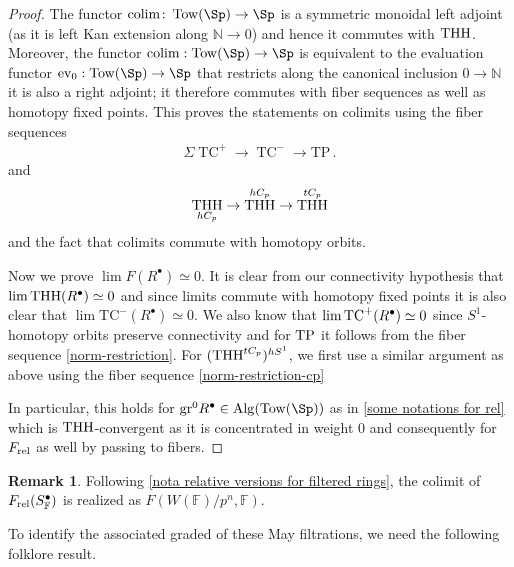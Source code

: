 \documentclass[english,10pt]{amsart}
\newcommand{\rel}{\textup{rel}}
\newcommand{\field}{\mathbb{F}}
\theoremstyle{definition}
\newtheorem{rema}{Remark}[section]
\numberwithin{equation}{section}
\DeclareMathOperator{\TC}{TC}
\newcommand{\ntc}{\mathrm{TC}^{-}}
\DeclareMathOperator{\tp}{\ensuremath{\textup{TP}}}
\DeclareMathOperator{\tc}{\ensuremath{\textup{TC}}}
\DeclareMathOperator{\thh}{\ensuremath{\textup{THH}}}
\DeclareMathOperator*{\colim}{colim}
\newcommand{\Tow}{\mathrm{Tow}}
\newcommand{\Alg}{\mathrm{Alg}}
\newcommand{\TP}{\mathrm{TP}}
\newcommand{\N}{\mathbb{N}}
\def\co{\colon\thinspace}
\begin{document}
\begin{proof}
The functor $\colim \co \Tow(\Sp)\to \Sp$ is a symmetric monoidal left adjoint (as it is left Kan extension along $\N\to 0$) \cite[Corollary~3.7]{nikolaus2016stablemultyoneda} and hence it commutes with $\thh$. Moreover, the functor $\mathrm{colim}: \mathrm{Tow}(\Sp)\to \Sp$ is equivalent to the evaluation functor $\mathrm{ev}_0: \mathrm{Tow}(\Sp)\to \Sp$ that restricts along the canonical inclusion $0\to \N$ it is also a right adjoint; it therefore commutes with fiber sequences as well as homotopy fixed points. 
This proves the statements on colimits using the fiber sequences 
\begin{align}\label{norm-restriction}
    \Sigma \TC^+\to \TC^{-}\to \TP \,.
\end{align}
and 
\begin{align}\label{norm-restriction-cp}
    \thh_{hC_p}\to \thh^{hC_p}\to \thh^{tC_p} 
\end{align} 
and the fact that colimits commute with homotopy orbits. 

Now we prove $\lim F(R^\bullet)\simeq 0$. It is clear from our connectivity hypothesis that $\lim \thh(R^{\bullet})\simeq 0$ and since limits commute with homotopy fixed points it is also clear that $\lim \ntc(R^{\bullet})\simeq 0$. We also know that $\lim \tc^+(R^{\bullet})\simeq 0$ since $S^1$-homotopy orbits preserve connectivity and for $\tp$ it follows from the fiber sequence \eqref{norm-restriction}.
For $(\thh^{tC_p})^{hS^1}$, we first use a similar argument as above using the fiber sequence \eqref{norm-restriction-cp}

 In particular, this holds for $\mathrm{gr}^0R^{\bullet}\in \Alg(\Tow(\Sp))$ as in \autoref{some notations for rel} which is $\thh$-convergent as it is concentrated in weight $0$ and consequently for $F_{\rel}$ as well by passing to fibers. 
\end{proof}

\begin{rema}
Following \autoref{nota relative versions for filtered rings}, the colimit of $F_{\rel} (S_{\field}^\bullet)$ is realized as $F(W(\field)/p^n,\field)$.
\end{rema}

To identify the associated graded of these May filtrations, we need the following folklore result. 
\end{document}

